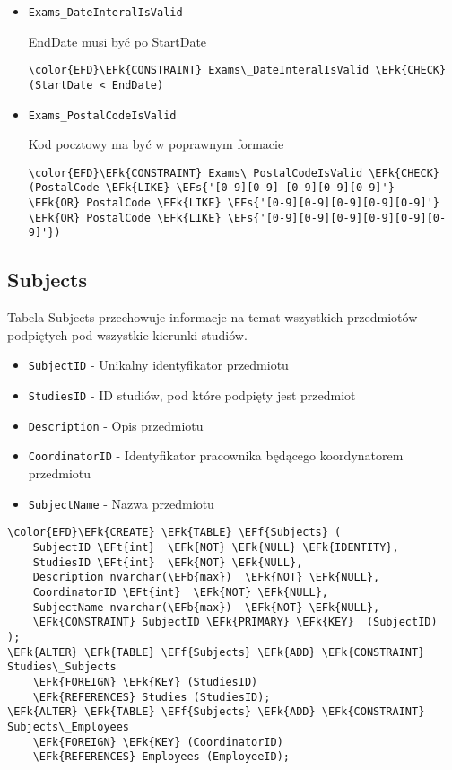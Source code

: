 \documentclass[11pt]{article}
\newcommand{\EFs}[1]{\textcolor{EFs}{#1}} %
\newcommand{\EFk}[1]{\textcolor{EFk}{\textbf{#1}}} %
\newcommand{\EFb}[1]{\textcolor{EFb}{\textbf{#1}}} %
\newcommand{\EFf}[1]{\textcolor{EFf}{#1}} %
\newcommand{\EFt}[1]{\textcolor{EFt}{\textbf{#1}}} %
\begin{document}
\begin{itemize}
\item \texttt{Exams\_DateInteralIsValid}

EndDate musi być po StartDate
\begin{Code}
\begin{Verbatim}
\color{EFD}\EFk{CONSTRAINT} Exams\_DateInteralIsValid \EFk{CHECK}
(StartDate < EndDate)
\end{Verbatim}
\end{Code}
\item \texttt{Exams\_PostalCodeIsValid}

Kod pocztowy ma być w poprawnym formacie
\begin{Code}
\begin{Verbatim}
\color{EFD}\EFk{CONSTRAINT} Exams\_PostalCodeIsValid \EFk{CHECK}
(PostalCode \EFk{LIKE} \EFs{'[0-9][0-9]-[0-9][0-9][0-9]'}
\EFk{OR} PostalCode \EFk{LIKE} \EFs{'[0-9][0-9][0-9][0-9][0-9]'}
\EFk{OR} PostalCode \EFk{LIKE} \EFs{'[0-9][0-9][0-9][0-9][0-9][0-9]'})
\end{Verbatim}
\end{Code}
\end{itemize}
\subsection{Subjects}
\label{sec:orgddc26d0}
Tabela Subjects przechowuje informacje na temat wszystkich przedmiotów podpiętych pod wszystkie kierunki studiów.
\begin{itemize}
\item \texttt{SubjectID} - Unikalny identyfikator przedmiotu
\item \texttt{StudiesID} - ID studiów, pod które podpięty jest przedmiot
\item \texttt{Description} - Opis przedmiotu
\item \texttt{CoordinatorID} - Identyfikator pracownika będącego koordynatorem przedmiotu
\item \texttt{SubjectName} - Nazwa przedmiotu
\end{itemize}
\begin{Code}
\begin{Verbatim}
\color{EFD}\EFk{CREATE} \EFk{TABLE} \EFf{Subjects} (
    SubjectID \EFt{int}  \EFk{NOT} \EFk{NULL} \EFk{IDENTITY},
    StudiesID \EFt{int}  \EFk{NOT} \EFk{NULL},
    Description nvarchar(\EFb{max})  \EFk{NOT} \EFk{NULL},
    CoordinatorID \EFt{int}  \EFk{NOT} \EFk{NULL},
    SubjectName nvarchar(\EFb{max})  \EFk{NOT} \EFk{NULL},
    \EFk{CONSTRAINT} SubjectID \EFk{PRIMARY} \EFk{KEY}  (SubjectID)
);
\EFk{ALTER} \EFk{TABLE} \EFf{Subjects} \EFk{ADD} \EFk{CONSTRAINT} Studies\_Subjects
    \EFk{FOREIGN} \EFk{KEY} (StudiesID)
    \EFk{REFERENCES} Studies (StudiesID);
\EFk{ALTER} \EFk{TABLE} \EFf{Subjects} \EFk{ADD} \EFk{CONSTRAINT} Subjects\_Employees
    \EFk{FOREIGN} \EFk{KEY} (CoordinatorID)
    \EFk{REFERENCES} Employees (EmployeeID);
\end{Verbatim}
\end{Code}
\end{document}
